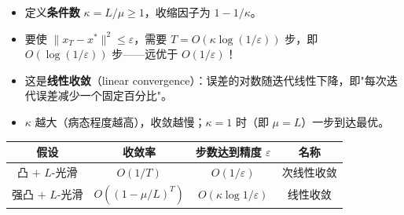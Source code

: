 \documentclass[12pt, a4paper]{ctexart}
\begin{document}
\begin{keypoint}[线性收敛率的含义]

\begin{itemize}
    \item 定义\textbf{条件数} $\kappa = L/\mu \geq 1$，收缩因子为 $1 - 1/\kappa$。
    \item 要使 $\|x_T - x^*\|^2 \leq \varepsilon$，需要 $T = O(\kappa \log(1/\varepsilon))$ 步，即 $O(\log(1/\varepsilon))$ 步——远优于 $O(1/\varepsilon)$！
    \item 这是\textbf{线性收敛}（linear convergence）：误差的对数随迭代线性下降，即"每次迭代误差减少一个固定百分比"。
    \item $\kappa$ 越大（病态程度越高），收敛越慢；$\kappa = 1$ 时（即 $\mu = L$）一步到达最优。
\end{itemize}

\begin{center}
\begin{tabular}{c|c|c|c}
假设 & 收敛率 & 步数达到精度 $\varepsilon$ & 名称 \\
\hline
凸 $+$ $L$-光滑 & $O(1/T)$ & $O(1/\varepsilon)$ & 次线性收敛 \\
强凸 $+$ $L$-光滑 & $O((1-\mu/L)^T)$ & $O(\kappa \log 1/\varepsilon)$ & 线性收敛
\end{tabular}
\end{center}

\end{keypoint}
\end{document}
